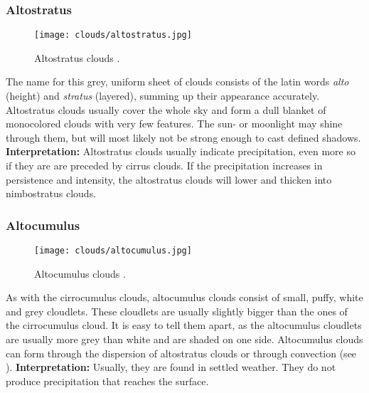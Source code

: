 \clearpage

\subsubsection{Altostratus}
\begin{wrapfigure}[10]{r}{6cm}
    \vspace{-\baselineskip}
    \texttt{[image: clouds/altostratus.jpg]}
    \caption{Altostratus clouds \protect\cite{cloudtypes:meteoblue}.}
    \label{img:clouds:altostratus}
\end{wrapfigure}
The name for this grey, uniform sheet of clouds consists of the latin words \emph{alto} (height) and \emph{stratus} (layered), summing up their appearance accurately.
Altostratus clouds usually cover the whole sky and form a dull blanket of monocolored clouds with very few features.
The sun- or moonlight may shine through them, but will most likely not be strong enough to cast defined shadows.
\emptyline
\textbf{Interpretation:}
Altostratus clouds usually indicate \gls{precipitation}, even more so if they are are preceded by cirrus clouds.
If the \gls{precipitation} increases in persistence and intensity, the altostratus clouds will lower and thicken into nimbostratus clouds.


\subsubsection{Altocumulus}
\begin{wrapfigure}[9]{r}{6cm}
    \vspace{-\baselineskip}
    \texttt{[image: clouds/altocumulus.jpg]}
    \caption{Altocumulus clouds \protect\cite{cloudtypes:wiki:altocumulus}.}
    \label{img:clouds:altocumulus}
\end{wrapfigure}
As with the cirrocumulus clouds, altocumulus clouds consist of small, puffy, white and grey \gls{cloudlet}s.
These \gls{cloudlet}s are usually slightly bigger than the ones of the cirrocumulus cloud.
It is easy to tell them apart, as the altocumulus \gls{cloudlet}s are usually more grey than white and are shaded on one side.
Altocumulus clouds can form through the dispersion of altostratus clouds or through \gls{convection} (see ).
\emptyline
\textbf{Interpretation:}
Usually, they are found in settled weather. They do not produce \gls{precipitation} that reaches the surface.


